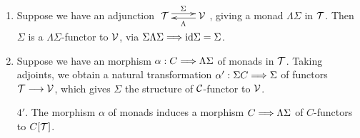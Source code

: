 \documentclass[11pt]{article}
\begin{document}
\begin{itemise}
\begin{exmps*}[9.5]
\begin{enumerate}
\item Suppose we have an adjunction $\xymatrix@R=.3cm{
\calT  \ar@<.6ex>[r]^{\Sigma}&
\calV  \ar@<.4ex>[l]^{\Lambda}}$, giving a monad $\Lambda\Sigma$ in $\mathcal{T}$. Then $\Sigma$ is a $\Lambda\Sigma$-functor to $\mathcal{V}$, via $\Sigma\Lambda\Sigma\Longrightarrow \textup{id}\Sigma=\Sigma$.
\item Suppose we have an morphism $\alpha:C\Longrightarrow\Lambda\Sigma$ of monads in $\mathcal{T}$. Taking adjoints, we obtain a natural transformation $\alpha':\Sigma C\Longrightarrow \Sigma$ of functors $\mathcal{T}\longrightarrow\mathcal{V}$, which gives $\Sigma$ the structure of $\mathcal{C}$-functor to $\mathcal{V}$. 
\item[$4'$.] The morphism $\alpha$ of monads induces a morphism $C\Longrightarrow\Lambda\Sigma$ of $C$-functors to $C[\mathcal{T}]$.
\end{enumerate}
\end{exmps*}

\end{itemise}
\end{document}
